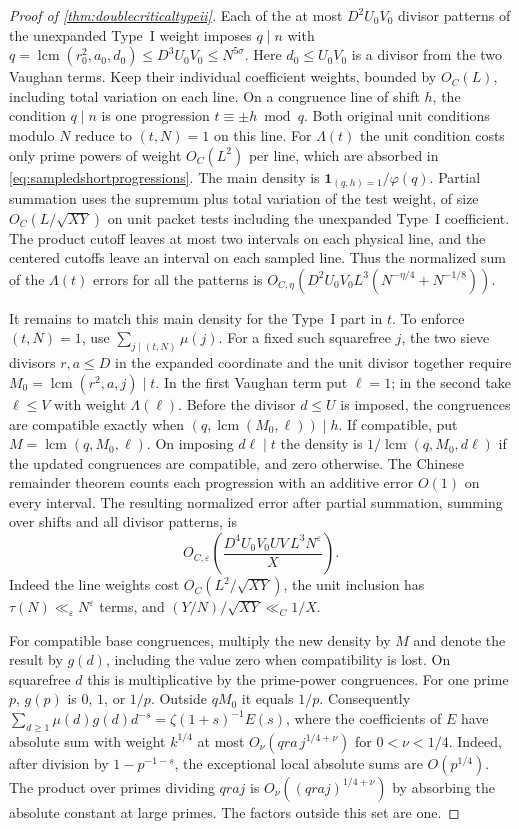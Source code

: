 \documentclass[11pt,a4paper]{article}
\numberwithin{equation}{section}
\begin{document}
\begin{proof}[Proof of \cref{thm:doublecriticaltypeii}]
Each of the at most $D^2U_0V_0$ divisor patterns of the
unexpanded Type~I weight imposes $q\mid n$ with
$q=\operatorname{lcm}(r_0^2,a_0,d_0)\le D^3U_0V_0\le N^{5\sigma}$.
Here $d_0\le U_0V_0$ is a divisor from the two Vaughan
terms. Keep their individual coefficient weights, bounded
by $O_C(L)$, including total variation on each line.
On a congruence line of shift $h$, the condition $q\mid n$
is one progression $t\equiv \pm h\bmod q$. Both original
unit conditions modulo $N$ reduce to $(t,N)=1$ on this line.
For $\Lambda(t)$ the unit condition costs only prime powers
of weight $O_C(L^2)$ per line, which are absorbed in
\cref{eq:sampledshortprogressions}. The main density is
$\mathbf1_{(q,h)=1}/\varphi(q)$.
Partial summation uses the supremum plus total variation
of the test weight, of size $O_C(L/\sqrt{XY})$ on unit
packet tests including the unexpanded Type~I coefficient.
The product cutoff leaves at most two intervals on each
physical line, and the centered cutoffs leave an interval
on each sampled line. Thus the normalized sum of the
$\Lambda(t)$ errors for all the patterns is
$O_{C,\eta}(D^2U_0V_0 L^3(N^{-\eta/4}+N^{-1/8}))$.

It remains to match this main density for the Type~I part
in $t$. To enforce $(t,N)=1$, use
$\sum_{j\mid(t,N)}\mu(j)$. For a fixed such squarefree $j$,
the two sieve divisors $r,a\le D$ in the expanded coordinate
and the unit divisor together require
$M_0=\operatorname{lcm}(r^2,a,j)\mid t$.
In the first Vaughan term put $\ell=1$; in the second
take $\ell\le V$ with weight $\Lambda(\ell)$.
Before the divisor $d\le U$ is imposed, the congruences
are compatible exactly when
$(q,\operatorname{lcm}(M_0,\ell))\mid h$.
If compatible, put $M=\operatorname{lcm}(q,M_0,\ell)$.
On imposing $d\ell\mid t$ the density is
$1/\operatorname{lcm}(q,M_0,d\ell)$ if the updated
congruences are compatible, and zero otherwise.
The Chinese remainder theorem counts each progression
with an additive error $O(1)$ on every interval.
The resulting normalized error after partial summation,
summing over shifts and all divisor patterns, is
\[
 O_{C,\varepsilon}\left(
     \frac{D^4 U_0 V_0 UV\,L^3 N^\varepsilon}{X}\right).
\]
Indeed the line weights cost $O_C(L^2/\sqrt{XY})$,
the unit inclusion has $\tau(N)\ll_\varepsilon N^\varepsilon$
terms, and $(Y/N)/\sqrt{XY}\ll_C1/X$.

For compatible base congruences, multiply the new density
by $M$ and denote the result by $g(d)$, including the
value zero when compatibility is lost. On squarefree $d$
this is multiplicative by the prime-power congruences.
For one prime $p$, $g(p)$ is $0$, $1$, or $1/p$.
Outside $qM_0$ it equals $1/p$. Consequently
$\sum_{d\ge1}\mu(d)g(d)d^{-s}=\zeta(1+s)^{-1}E(s)$,
where the coefficients of $E$ have absolute sum with
weight $k^{1/4}$ at most $O_\nu(qra\,j^{1/4+\nu})$ for
$0<\nu<1/4$. Indeed, after division by $1-p^{-1-s}$,
the exceptional local absolute sums are $O(p^{1/4})$.
The product over primes dividing $qra j$ is
$O_\nu((qra j)^{1/4+\nu})$ by absorbing the absolute
constant at large primes. The factors outside this set
are one.


\end{proof}
\end{document}
